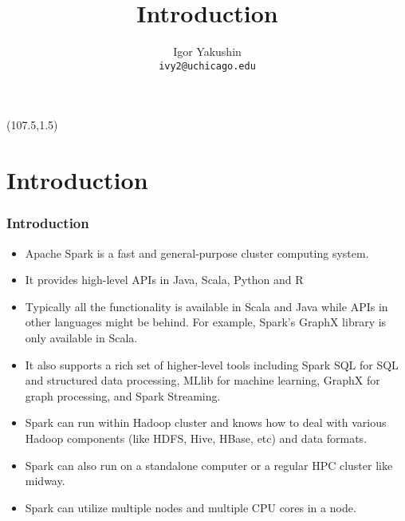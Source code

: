 \documentclass{beamer}
\title{\huge{Introduction}}
\author{Igor Yakushin \\ \texttt{ivy2@uchicago.edu}}
\newcommand{\SPARK}{
\begin{textblock}{14}(107.5,1.5)
  \pgfuseimage{spark}
\end{textblock}
}
\begin{document}



\begin{frame}
\SPARK
\titlepage
\end{frame}


\section{Introduction}

\begin{frame}[fragile]
  \frametitle{Introduction}
  
\begin{itemize}
\item Apache Spark is a fast and general-purpose cluster computing system. 
\item It provides high-level APIs in Java, Scala, Python and R
\item Typically all the functionality is available in Scala and Java while APIs 
  in other languages might be behind. For example, Spark's GraphX library is only available in Scala.
\item It also supports a rich set of higher-level tools including Spark SQL for SQL 
  and structured data processing, MLlib for machine learning, GraphX for graph processing, and Spark Streaming.
\item Spark can run within Hadoop cluster and knows how to deal with various 
  Hadoop components (like HDFS, Hive, HBase, etc) and data formats.
\item Spark can also run on a standalone computer or a regular HPC cluster like midway.
\item Spark can utilize multiple nodes and multiple CPU cores in a node.
\end{itemize}

\end{frame}
\end{document}
